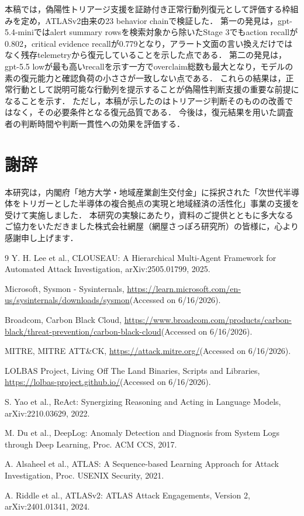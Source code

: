 \documentclass[a4paper,twocolumn,10pt]{article}
\newcommand{\code}[1]{{\small\ttfamily #1}}
\begin{document}
本稿では，偽陽性トリアージ支援を証跡付き正常行動列復元として評価する枠組みを定め，ATLASv2由来の23 behavior chain\cite{atlasv2}で検証した．
第一の発見は，\code{gpt-5.4-mini}ではalert summary rowsを検索対象から除いたStage 3でもaction recallが0.802，critical evidence recallが0.779となり，アラート文面の言い換えだけではなく残存telemetryから復元していることを示した点である．
第二の発見は，\code{gpt-5.5 low}が最も高いrecallを示す一方でoverclaim総数も最大となり，モデルの素の復元能力と確認負荷の小ささが一致しない点である．
これらの結果は，正常行動として説明可能な行動列を提示することが偽陽性判断支援の重要な前提になることを示す．
ただし，本稿が示したのはトリアージ判断そのものの改善ではなく，その必要条件となる復元品質である．
今後は，復元結果を用いた調査者の判断時間や判断一貫性への効果を評価する．

\section*{謝辞}

本研究は，内閣府「地方大学・地域産業創生交付金」に採択された「次世代半導体をトリガーとした半導体の複合拠点の実現と地域経済の活性化」事業の支援を受けて実施しました．
本研究の実験にあたり，資料のご提供とともに多大なるご協力をいただきました株式会社網屋（網屋さっぽろ研究所）の皆様に，心より感謝申し上げます．

\begin{thebibliography}{9}
Y. H. Lee et al., CLOUSEAU: A Hierarchical Multi-Agent Framework for Automated Attack Investigation, arXiv:2505.01799, 2025.

Microsoft, Sysmon - Sysinternals, \url{https://learn.microsoft.com/en-us/sysinternals/downloads/sysmon}(Accessed on 6/16/2026).

Broadcom, Carbon Black Cloud, \url{https://www.broadcom.com/products/carbon-black/threat-prevention/carbon-black-cloud}(Accessed on 6/16/2026).

MITRE, MITRE ATT\&CK, \url{https://attack.mitre.org/}(Accessed on 6/16/2026).

LOLBAS Project, Living Off The Land Binaries, Scripts and Libraries, \url{https://lolbas-project.github.io/}(Accessed on 6/16/2026).

S. Yao et al., ReAct: Synergizing Reasoning and Acting in Language Models, arXiv:2210.03629, 2022.

M. Du et al., DeepLog: Anomaly Detection and Diagnosis from System Logs through Deep Learning, Proc. ACM CCS, 2017.

A. Alsaheel et al., ATLAS: A Sequence-based Learning Approach for Attack Investigation, Proc. USENIX Security, 2021.

A. Riddle et al., ATLASv2: ATLAS Attack Engagements, Version 2, arXiv:2401.01341, 2024.
\end{thebibliography}
\end{document}
